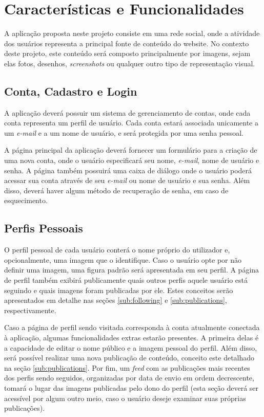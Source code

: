 \documentclass[12pt]{article}
\begin{document}
\section{Características e Funcionalidades} \label{sec:funcs}

A aplicação proposta neste projeto consiste em uma rede social, onde a atividade dos usuários representa a principal fonte de conteúdo do website. No contexto deste projeto, este conteúdo será composto principalmente por imagens, sejam elas fotos, desenhos, \textit{screenshots} ou qualquer outro tipo de representação visual.

\subsection{Conta, Cadastro e Login} \label{sec:account}

A aplicação deverá possuir um sistema de gerenciamento de contas, onde cada conta representa um perfil de usuário. Cada conta estará associada unicamente a um \textit{e-mail} e a um nome de usuário, e será protegida por uma senha pessoal.

A página principal da aplicação deverá fornecer um formulário para a criação de uma nova conta, onde o usuário especificará seu nome, \textit{e-mail}, nome de usuário e senha. A página também possuirá uma caixa de diálogo onde o usuário poderá acessar sua conta através de seu \textit{e-mail} ou nome de usuário e sua senha. Além disso, deverá haver algum método de recuperação de senha, em caso de esquecimento.

\subsection{Perfis Pessoais} \label{sub:profiles}

O perfil pessoal de cada usuário conterá o nome próprio do utilizador e, opcionalmente, uma imagem que o identifique. Caso o usuário opte por não definir uma imagem, uma figura padrão será apresentada em seu perfil. A página de perfil também exibirá publicamente quais outros perfis aquele usuário está seguindo e quais imagens foram publicadas por ele. Estes conceitos serão apresentados em detalhe nas seções \ref{sub:following} e \ref{sub:publications}, respectivamente.

Caso a página de perfil sendo visitada corresponda à conta atualmente conectada à aplicação, algumas funcionalidades extras estarão presentes. A primeira delas é a capacidade de editar o nome público e a imagem pessoal do perfil. Além disso, será possível realizar uma nova publicação de conteúdo, conceito este detalhado na seção \ref{sub:publications}. Por fim, um \textit{feed} com as publicações mais recentes dos perfis sendo seguidos, organizadas por data de envio em ordem decrescente, tomará o lugar das imagens publicadas pelo dono do perfil (esta seção deverá ser acessível por algum outro meio, caso o usuário deseje examinar suas próprias publicações).
\end{document}
